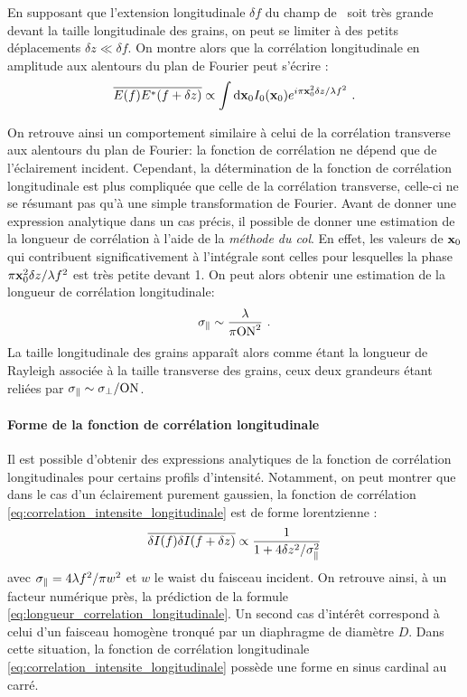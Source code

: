 En supposant que l'extension longitudinale $\delta f$ du champ de \speckle\ soit très grande devant la taille longitudinale des grains, on peut se limiter à des petits déplacements $\delta z \ll \delta f$. On montre alors que la corrélation longitudinale en amplitude aux alentours du plan de Fourier peut s'écrire \citep{magatti2009three}:
\begin{equation}
\overline{E(f)E^*(f+\delta z)} \propto \int{\mathrm{d} \mathbf{x}_0I_0 (\mathbf{x}_0) e^{i\pi \mathbf{x}_0^2 \delta z / \lambda f^2} } \text{ .}
\label{eq:correlation_longitudinale_1_speckle}
\end{equation}

On retrouve ainsi un comportement similaire à celui de la corrélation transverse aux alentours du plan de Fourier: la fonction de corrélation ne dépend que de l'éclairement incident. Cependant, la détermination de la fonction de corrélation longitudinale est plus compliquée que celle de la corrélation transverse, celle-ci ne se résumant pas qu'à une simple transformation de Fourier. Avant de donner une expression analytique dans un cas précis, il possible de donner une estimation de la longueur de corrélation à l'aide de la \emph{méthode du col}. En effet, les valeurs de $\mathbf{x}_0$ qui contribuent significativement à l'intégrale sont celles pour lesquelles la phase $\pi \mathbf{x}_0^2 \delta z /\lambda f^2$ est très petite devant 1. On peut alors obtenir une estimation de la longueur de corrélation longitudinale:
\begin{equation}
\sigma_{\parallel} \sim \frac{\lambda }{ \pi \mathrm{ON}^2} \text{ .}
\label{eq:longueur_correlation_longitudinale}
\end{equation}
La taille longitudinale des grains apparaît alors comme étant la longueur de Rayleigh associée à la taille transverse des grains, ceux deux grandeurs étant reliées par $\sigma_{\parallel} \sim \sigma_{\perp} /\mathrm{ON}$.







\paragraph*{Forme de la fonction de corrélation longitudinale}

Il est possible d'obtenir des expressions analytiques de la fonction de corrélation longitudinales pour certains profils d'intensité. Notamment, on peut montrer que dans le cas d'un éclairement purement gaussien, la fonction de corrélation \ref{eq:correlation_intensite_longitudinale} est de forme lorentzienne \citep{goodman2007speckle}:
\begin{equation}
\overline{\delta I(f) \delta I(f+\delta z)} \propto \frac{1}{1+4\delta z^2/\sigma_{\parallel}^2}
\end{equation}
avec $\sigma_{\parallel}=4\lambda f^2/\pi w^2$ et $w$ le waist du faisceau incident. On retrouve ainsi, à un facteur numérique près, la prédiction de la formule \ref{eq:longueur_correlation_longitudinale}. Un second cas d'intérêt correspond à celui d'un faisceau homogène tronqué par un diaphragme de diamètre $D$. Dans cette situation, la fonction de corrélation longitudinale \ref{eq:correlation_intensite_longitudinale} possède une forme en sinus cardinal au carré.

